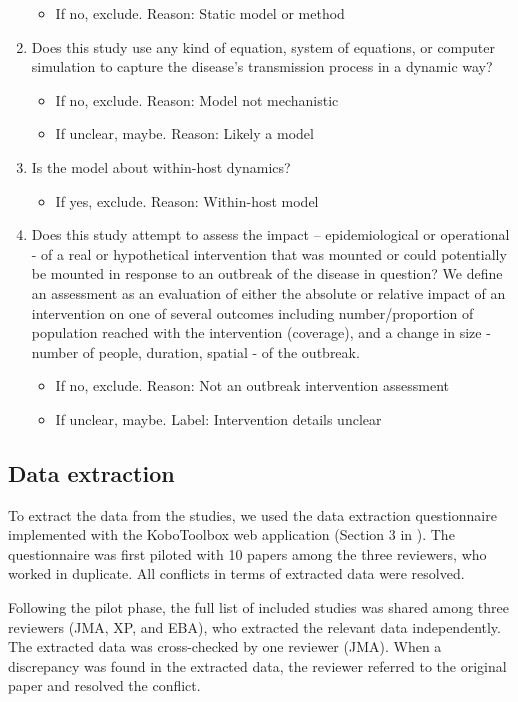 \documentclass[10pt,letterpaper]{article}
\begin{document}
\begin{enumerate}
\begin{itemize}
		\item 	If no, exclude. Reason: Static model or method
	\end{itemize}
	\item Does this study use any kind of equation, system of equations, or computer simulation to capture the disease’s transmission process in a dynamic way?
	\begin{itemize}
		\item 	If no, exclude. Reason: Model not mechanistic
		\item 	If unclear, maybe. Reason: Likely a model
	\end{itemize}
	\item Is the model about within-host dynamics?
	\begin{itemize}
		\item 	If yes, exclude. Reason: Within-host model
	\end{itemize}
	\item Does this study attempt to assess the impact – epidemiological or operational - of a real or hypothetical intervention that was mounted or could potentially be mounted in response to an outbreak of the disease in question? We define an assessment as an evaluation of either the absolute or relative impact of an intervention on one of several outcomes including number/proportion of population reached with the intervention (coverage), and a change in size - number of people, duration, spatial - of the outbreak.
	\begin{itemize}
		\item 	If no, exclude. Reason: Not an outbreak intervention assessment
		\item 	If unclear, maybe. Label: Intervention details unclear
	\end{itemize}
\end{enumerate}

\subsection*{Data extraction}
To extract the data from the studies, we used the data extraction questionnaire implemented with the KoboToolbox web application (Section 3 in ). The questionnaire was first piloted with 10 papers among the three reviewers, who worked in duplicate. All conflicts in terms of extracted data were resolved. 

Following the pilot phase, the full list of included studies was shared among three reviewers (JMA, XP, and EBA), who extracted the relevant data independently. The extracted data was cross-checked by one reviewer (JMA). When a discrepancy was found in the extracted data, the reviewer referred to the original paper and resolved the conflict.  
\end{document}
